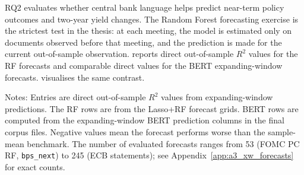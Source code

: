 RQ2 evaluates whether central bank language helps predict near-term policy
outcomes and two-year yield changes. The Random Forest forecasting exercise is
the strictest test in the thesis: at each meeting, the model is estimated only
on documents observed before that meeting, and the prediction is made for the
current out-of-sample observation.  reports
direct out-of-sample $R^2$ values for the RF forecasts and comparable direct
values for the BERT expanding-window forecasts.
 visualises the same contrast.

\begin{table}[H]
\centering
\caption{RQ2 direct expanding-window forecast performance}
\label{tab:rq2_direct_oos_v31}
\begin{threeparttable}
\small
{}
\begin{tablenotes}
\footnotesize
\item Notes: Entries are direct out-of-sample $R^2$ values from expanding-window predictions. The RF rows are from the Lasso+RF forecast grids. BERT rows are computed from the expanding-window BERT prediction columns in the final corpus files. Negative values mean the forecast performs worse than the sample-mean benchmark. The number of evaluated forecasts ranges from 53 (FOMC PC RF, \texttt{bps\_next}) to 245 (ECB statements); see Appendix~\ref{app:a3_xw_forecasts} for exact counts.
\end{tablenotes}
\end{threeparttable}
\end{table}

